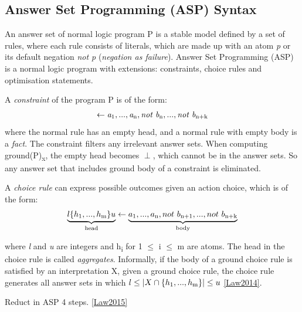 \documentclass[11pt,twoside]{report}
\theoremstyle{plain}
\theoremstyle{definition}
\begin{document}
\subsection{Answer Set Programming (ASP) Syntax}

An answer set of normal logic program P is a stable model defined by a set of rules, where each rule consists of literals, which are made up with an atom \textit{p} or its default negation \textit{not p} (\textit{negation as failure}). Answer Set Programming (ASP) is a normal logic program with extensions: constraints, choice rules and optimisation statements.

A \textit{constraint} of the program P is of the form:
\begin{equation}
\begin{split}
\leftarrow \textit{a}\textsubscript{1}, ..., \textit{a}\textsubscript{n}, \textit{not b}\textsubscript{n}, ..., \textit{not b}\textsubscript{n+k}
\end{split}
\label{asp_choice_rule}
\end{equation}
where the normal rule has an empty head, and a normal rule  with empty body is a \textit{fact}.
 The constraint filters any irrelevant answer sets. When computing ground(P)\textsubscript{x}, the empty head becomes $\perp$, which cannot be in the answer sets. So any answer set that includes ground body of a constraint is eliminated.

A \textit{choice rule} can express possible outcomes given an action choice, which is of the form:
\begin{equation}
\begin{split}
\underbrace{l\{h\textsubscript{1},...,h\textsubscript{m}\}u}_\text{head} \leftarrow \underbrace{a\textsubscript{1}, ..., a\textsubscript{n}, not\ b\textsubscript{n+1}, ..., not\ b\textsubscript{n+k}}_\text{body}
\end{split}
\label{asp_choice_rule}
\end{equation}

where \textit{l} and \textit{u} are integers and h\textsubscript{i} for 1 $\leq$ i $\leq$ m are atoms. The head in the choice rule is called \textit{aggregates}.
Informally, if the body of a ground choice rule is satisfied by an interpretation X, given a ground choice rule, the choice rule generates all answer sets in which  $l \leq | X \cap \{h\textsubscript{1},...,h\textsubscript{m}\} | \leq u$
\ref{Law2014}.


Reduct in ASP 4 steps. 
\ref{Law2015}
\end{document}
